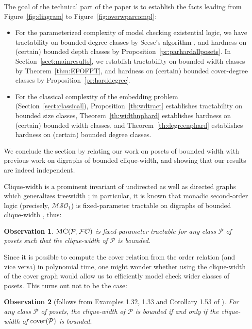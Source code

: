 \documentclass[usletter]{article}
\newtheorem{observation}{Observation}
\begin{document}
The goal of the technical part of the paper is to establish 
the facts leading from Figure~\ref{fig:diagram} to Figure~\ref{fig:overwparcompl}:
\begin{itemize}
\item For the parameterized complexity of model checking existential logic, 
we have tractability on bounded degree classes by Seese's algorithm \cite{Seese96}, 
and hardness on (certain) bounded depth classes by Proposition~\ref{pr:parhardallposets}.  
In Section~\ref{sect:mainresults}, we establish tractability on bounded width classes 
by Theorem~\ref{thm:EFOFPT}, and hardness on (certain) bounded cover-degree classes by Proposition~\ref{pr:harddegree}.
\item For the classical complexity of the embedding problem 
 (Section~\ref{sect:classical}), 
Proposition~\ref{th:wdtract} establishes tractability on bounded size classes, 
Theorem~\ref{th:widthnphard} establishes hardness on (certain) bounded width classes, 
and Theorem~\ref{th:degreenphard} establishes hardness on (certain) bounded degree classes.  
\end{itemize}




We conclude the section by relating our work on posets of bounded width 
with previous work on digraphs of bounded clique-width, and showing that 
our results are indeed independent. 

Clique-width is a prominent invariant 
of undirected as well as directed graphs which generalizes treewidth \cite{CourcelleOlariu00}; in particular, 
it is known that monadic second-order logic (precisely, $\mathcal{MSO}_1$) 
is fixed-parameter tractable on digraphs of bounded clique-width \cite{CourcelleMakowskyRotics00}, 
thus:

\begin{observation}
\label{obs:MSO}
$\textsc{MC}(\mathcal{P},\mathcal{FO})$ is fixed-parameter tractable for any class $\mathcal{P}$ of posets such that the clique-width of $\mathcal{P}$ is bounded.
\end{observation}

Since it is possible to compute the cover relation from the order relation (and vice versa) in polynomial time, one might wonder whether using the clique-width of the cover graph would allow us to efficiently model check wider classes of posets. This turns out not to be the case:

\begin{observation}[follows from Examples 1.32, 1.33 and Corollary 1.53 of \cite{CourcelleEngelfriet12}]
\label{obs:cw}
For any class $\mathcal{P}$ of posets, the clique-width of $\mathcal{P}$ is bounded if and only if the clique-width of $\textup{cover}(\mathcal{P})$ is bounded.
\end{observation}
\end{document}
